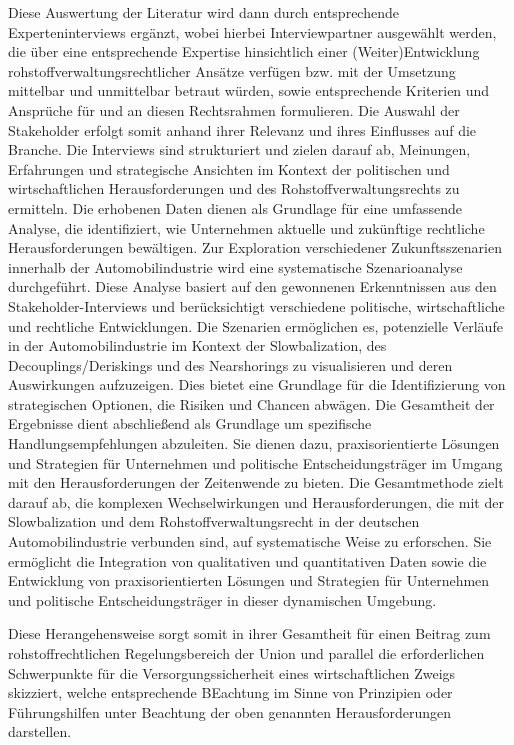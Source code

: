 \documentclass[12pt,a4paper,oneside]{book} %
\begin{document}
Diese Auswertung der Literatur wird dann durch entsprechende Experteninterviews ergänzt, wobei hierbei Interviewpartner ausgewählt werden, die über eine entsprechende Expertise hinsichtlich einer (Weiter)Entwicklung rohstoffverwaltungsrechtlicher Ansätze verfügen bzw. mit der Umsetzung mittelbar und unmittelbar betraut würden, sowie entsprechende Kriterien und Ansprüche für und an diesen Rechtsrahmen formulieren. Die Auswahl der Stakeholder erfolgt somit anhand ihrer Relevanz und ihres Einflusses auf die Branche. Die Interviews sind strukturiert und zielen darauf ab, Meinungen, Erfahrungen und strategische Ansichten im Kontext der politischen und wirtschaftlichen Herausforderungen und des Rohstoffverwaltungsrechts zu ermitteln. Die erhobenen Daten dienen als Grundlage für eine umfassende Analyse, die identifiziert, wie Unternehmen aktuelle und zukünftige rechtliche Herausforderungen bewältigen. Zur Exploration verschiedener Zukunftsszenarien innerhalb der Automobilindustrie wird eine systematische Szenarioanalyse durchgeführt. Diese Analyse basiert auf den gewonnenen Erkenntnissen aus den Stakeholder-Interviews und berücksichtigt verschiedene politische, wirtschaftliche und rechtliche Entwicklungen. Die Szenarien ermöglichen es, potenzielle Verläufe in der Automobilindustrie im Kontext der Slowbalization, des Decouplings/Deriskings und des Nearshorings zu visualisieren und deren Auswirkungen aufzuzeigen. Dies bietet eine Grundlage für die Identifizierung von strategischen Optionen, die Risiken und Chancen abwägen. Die Gesamtheit der Ergebnisse dient abschließend als Grundlage um spezifische Handlungsempfehlungen abzuleiten. Sie dienen dazu, praxisorientierte Lösungen und Strategien für Unternehmen und politische Entscheidungsträger im Umgang mit den Herausforderungen der Zeitenwende zu bieten.
Die Gesamtmethode zielt darauf ab, die komplexen Wechselwirkungen und Herausforderungen, die mit der Slowbalization und dem Rohstoffverwaltungsrecht in der deutschen Automobilindustrie verbunden sind, auf systematische Weise zu erforschen. Sie ermöglicht die Integration von qualitativen und quantitativen Daten sowie die Entwicklung von praxisorientierten Lösungen und Strategien für Unternehmen und politische Entscheidungsträger in dieser dynamischen Umgebung.


Diese Herangehensweise sorgt somit in ihrer Gesamtheit für einen Beitrag zum rohstoffrechtlichen Regelungsbereich der Union und parallel die erforderlichen Schwerpunkte für die Versorgungssicherheit eines wirtschaftlichen Zweigs skizziert, welche entsprechende BEachtung im Sinne von Prinzipien oder Führungshilfen unter Beachtung der oben genannten Herausforderungen darstellen.
\end{document}
